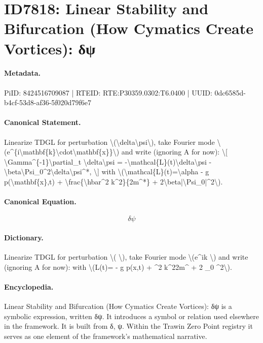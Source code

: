\section*{ID7818: Linear Stability and Bifurcation (How Cymatics Create Vortices): δψ}
\paragraph{Metadata.}
PiID: 8424516709087 | RTEID: RTE:P30359.0302:T6.0400 | UUID: 0dc6585d-b4cf-53d8-af36-5f020d79f6e7

\paragraph{Canonical Statement.}
Linearize TDGL for perturbation \textbackslash{}(\textbackslash{}delta\textbackslash{}psi\textbackslash{}), take Fourier mode \textbackslash{}(e\textasciicircum{}\{i\textbackslash{}mathbf\{k\}\textbackslash{}cdot\textbackslash{}mathbf\{x\}\}\textbackslash{}) and write (ignoring A for now): \textbackslash{}[ \textbackslash{}Gamma\textasciicircum{}\{-1\}\textbackslash{}partial\_t \textbackslash{}delta\textbackslash{}psi = -\textbackslash{}mathcal\{L\}(t)\textbackslash{}delta\textbackslash{}psi - \textbackslash{}beta\textbackslash{}Psi\_0\textasciicircum{}2\textbackslash{}delta\textbackslash{}psi\textasciicircum{}*, \textbackslash{}] with \textbackslash{}(\textbackslash{}mathcal\{L\}(t)=\textbackslash{}alpha - g p(\textbackslash{}mathbf\{x\},t) + \textbackslash{}frac\{\textbackslash{}hbar\textasciicircum{}2 k\textasciicircum{}2\}\{2m\textasciicircum{}*\} + 2\textbackslash{}beta|\textbackslash{}Psi\_0|\textasciicircum{}2\textbackslash{}).

\paragraph{Canonical Equation.}
\[
\delta\psi
\]

\paragraph{Dictionary.}
Linearize TDGL for perturbation \textbackslash{}( \textbackslash{}), take Fourier mode \textbackslash{}(e\textasciicircum{}ik \textbackslash{}) and write (ignoring A for now): with \textbackslash{}(L(t)= - g p(x,t) + \textasciicircum{}2 k\textasciicircum{}22m\textasciicircum{} + 2 \_0 \textasciicircum{}2\textbackslash{}).

\paragraph{Encyclopedia.}
Linear Stability and Bifurcation (How Cymatics Create Vortices): δψ is a symbolic expression, written δψ. It introduces a symbol or relation used elsewhere in the framework. It is built from δ, ψ. Within the Trawin Zero Point registry it serves as one element of the framework's mathematical narrative.
